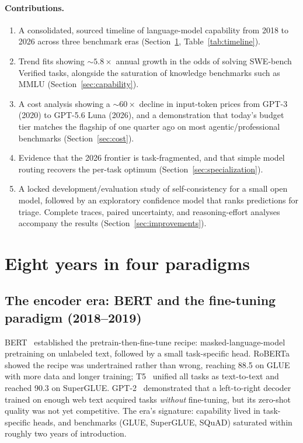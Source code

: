 \documentclass[11pt]{article}
\begin{document}
\paragraph{Contributions.}
\begin{enumerate}
    \item A consolidated, sourced timeline of language-model capability from
    2018 to 2026 across three benchmark eras (Section~\ref{sec:history},
    Table~\ref{tab:timeline}).
    \item Trend fits showing ${\sim}5.8\times$ annual growth in the odds of
    solving SWE-bench Verified tasks, alongside the saturation of
    knowledge benchmarks such as MMLU (Section~\ref{sec:capability}).
    \item A cost analysis showing a ${\sim}60\times$ decline in input-token
    prices from GPT-3 (2020) to GPT-5.6 Luna (2026), and a demonstration that
    today's budget tier matches the flagship of one quarter ago on most
    agentic/professional benchmarks (Section~\ref{sec:cost}).
    \item Evidence that the 2026 frontier is task-fragmented, and that simple
    model routing recovers the per-task optimum
    (Section~\ref{sec:specialization}).
    \item A locked development/evaluation study of self-consistency for a
    small open model, followed by an exploratory confidence model that ranks
    predictions for triage. Complete traces, paired uncertainty, and
    reasoning-effort analyses accompany the results
    (Section~\ref{sec:improvements}).
\end{enumerate}

\section{Eight years in four paradigms}\label{sec:history}

\subsection{The encoder era: BERT and the fine-tuning paradigm (2018--2019)}
BERT~\cite{devlin2019bert} established the pretrain-then-fine-tune recipe:
masked-language-model pretraining on unlabeled text, followed by a small
task-specific head. RoBERTa~\cite{liu2019roberta} showed the recipe was
undertrained rather than wrong, reaching 88.5 on GLUE with more data and longer
training; T5~\cite{raffel2020t5} unified all tasks as text-to-text and reached
90.3 on SuperGLUE. GPT-2~\cite{radford2019gpt2} demonstrated that a
left-to-right decoder trained on enough web text acquired tasks
\emph{without} fine-tuning, but its zero-shot quality was not yet competitive.
The era's signature: capability lived in task-specific heads, and benchmarks
(GLUE, SuperGLUE, SQuAD) saturated within roughly two years of introduction.
\end{document}
